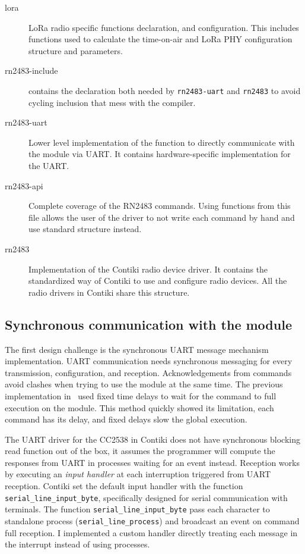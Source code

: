 \begin{description}
  \item[lora] LoRa radio specific functions declaration, and configuration. 
    This includes functions used to calculate the time-on-air and
    LoRa PHY configuration structure and parameters.
  \item[rn2483-include] contains the declaration both needed by
    \lstinline{rn2483-uart} and \lstinline{rn2483} to avoid cycling inclusion
    that mess with the compiler.
  \item[rn2483-uart] Lower level implementation of the function to directly
    communicate with the module via UART\@.
    It contains hardware-specific implementation for the UART\@.
  \item[rn2483-api] Complete coverage of the RN2483 commands. Using functions
    from this file allows the user of the driver to not write
    each command by hand and use standard structure instead.
  \item[rn2483] Implementation of the Contiki radio device driver. 
    It contains the standardized way of Contiki to use and configure radio
    devices.
    All the radio drivers in Contiki share this structure.
\end{description}

\subsection{Synchronous communication with the module}

The first design challenge is the
synchronous UART message mechanism implementation.
UART communication needs synchronous messaging for every
transmission, configuration, and reception.
Acknowledgements from commands avoid 
clashes when trying to use the module at the same time.
The previous implementation in~\cite{8847137} used fixed time delays to 
wait for the command to full execution on the module. This method 
quickly showed its limitation, each command has its delay, and
fixed delays slow the global execution.


The UART driver for the CC2538 in Contiki does not have synchronous 
blocking read function out of the box, it assumes the programmer will compute the
responses from UART in processes waiting for an event instead.
Reception works by executing an \emph{input handler} at each interruption
triggered from UART reception.
Contiki set the default input handler with the function
\lstinline{serial_line_input_byte},
specifically designed for serial communication with terminals. 
The function \lstinline{serial_line_input_byte} pass each character to standalone
process (\lstinline{serial_line_process}) and broadcast an event on command
full reception. 
I implemented a custom handler directly treating each message in the
interrupt instead of using processes.

